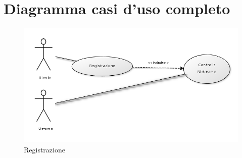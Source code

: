 \section{Diagramma casi d'uso completo}
\begin{figure}[H]
\centering
\includegraphics[scale=0.55]{img/registrazione.png}
\caption{Registrazione}
\label{fig:registrazione}
\end{figure}



